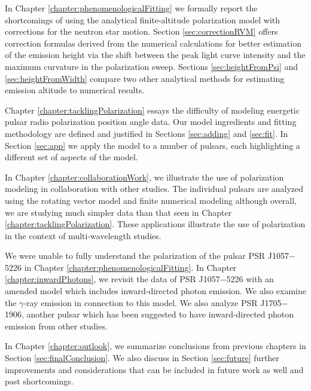 In Chapter \ref{chapter:phenomenologicalFitting}
we formally report the shortcomings of using 
the analytical finite-altitude polarization model with 
corrections for the neutron star motion. 
Section \ref{sec:correctionRVM}
offers correction formulas derived from 
the numerical calculations for better 
estimation of the emission height via the
shift between the peak light curve intensity  
and the maximum curvature in the polarization 
sweep.  Sections \ref{sec:heightFromPsi}
and \ref{sec:heightFromWidth} compare 
two other analytical methods for estimating 
emission altitude to numerical results.

Chapter \ref{chapter:tacklingPolarization}
essays the difficulty of modeling energetic
pulsar radio polarization position angle data.
Our model ingredients and fitting methodology
are defined and justified
in Sections \ref{sec:adding} and \ref{sec:fit}.
In Section \ref{sec:app} we apply the
model to a number of pulsars, each highlighting
a different set of aspects of the model.

In Chapter \ref{chapter:collaborationWork}, we 
illustrate the use of polarization modeling
in collaboration with other studies.  The
individual pulsars are analyzed using the
rotating vector model and finite numerical modeling
although overall, we are studying much simpler
data than that seen in Chapter 
\ref{chapter:tacklingPolarization}.  These applications
illustrate the use of polarization in the context of
multi-wavelength studies.  

We were unable to fully understand the 
polarization  of the pulsar PSR J1057$-$5226
in Chapter \ref{chapter:phenomenologicalFitting}.
In Chapter \ref{chapter:inwardPhotons}, we
revisit the data of PSR J1057$-$5226
with an amended model which includes inward-directed
photon emission.  We also examine the 
$\gamma$-ray emission in connection to this model.
We also analyze PSR J1705$-$1906, another pulsar which has 
been suggested to have inward-directed photon
emission from other studies.

In Chapter \ref{chapter:outlook}, we summarize
conclusions from previous chapters in Section \ref{sec:finalConclusion}.
We also discuss in Section \ref{sec:future} 
further improvements and considerations that can be included in 
future work as well and past shortcomings.
